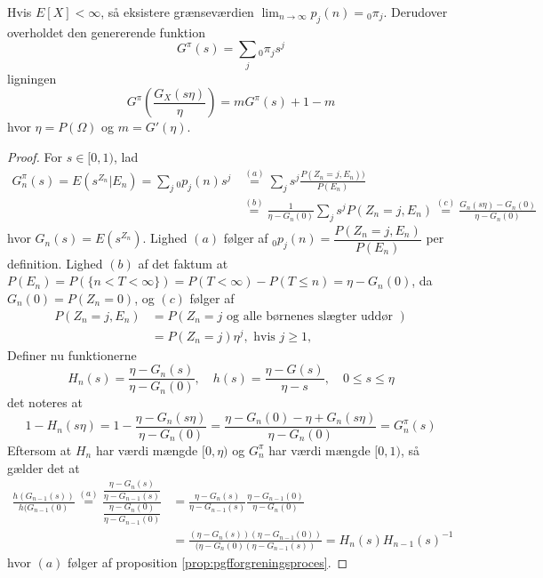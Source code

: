 \begin{lem}
Hvis $E[X] < \infty$, så eksistere grænseværdien $\lim_{n \to \infty} p_j (n) = {}_0\pi_j$. Derudover overholdet den genererende funktion
\begin{equation*}
    G^\pi(s) = \sum_j {}_0 \pi_j s^j
\end{equation*}
ligningen 
\begin{equation} \label{alg:alg6.7.2grim}
    G^\pi\left(\frac{G_X(s\eta)}{\eta}\right) = m G^\pi(s) + 1 - m
\end{equation}
hvor $\eta = P(\Omega)$ og $m = G'(\eta)$.
\end{lem}
\begin{proof}
For $s \in [0, 1)$, lad
\begin{align*}
    G_n^\pi (s) = E(s^{Z_n} | E_n) = \sum_j {}_0p_j(n)s^j &\stackrel{(a)}= \sum_j s^j \frac{P(Z_n = j, E_n))}{P(E_n)} \\ 
    &\stackrel{(b)} = \frac{1}{\eta - G_n(0)} \sum_j s^j P(Z_n = j, E_n) \stackrel{(c)} = \frac{G_n(s\eta) - G_n(0)}{\eta - G_n(0)}
\end{align*}
hvor $G_n(s) = E(s^{Z_n})$. Lighed $(a)$ følger af ${}_0p_j(n) = \dfrac{P(Z_n = j, E_n)}{P(E_n)}$ per definition. Lighed $(b)$ af det faktum at $P(E_n) = P(\{n < T < \infty\}) = P(T < \infty) - P(T \leq n) = \eta - G_n(0)$, da $G_n(0) = P(Z_n = 0)$, og $(c)$ følger af
\begin{align*}
    P(Z_n = j, E_n) &= P(Z_n = j \text{ og alle børnenes slægter uddør }) \\
    &= P(Z_n = j) \eta^j, \text{ hvis } j \geq 1,
\end{align*}
Definer nu funktionerne 
\begin{equation*}
    H_n(s) = \frac{\eta - G_n(s)}{\eta - G_n(0)}, \quad h(s) = \frac{\eta - G(s)}{\eta - s}, \quad 0 \leq s \leq \eta
\end{equation*}
det noteres at 
\begin{equation*} \label{eq:lemmaErAids}
    1 - H_n(s \eta) = 1 - \frac{\eta - G_n(s\eta)}{\eta - G_n(0)} = \frac{\eta - G_n(0) - \eta + G_n(s\eta)}{\eta - G_n(0)} = G_n^\pi(s)
\end{equation*}
Eftersom at $H_n$ har værdi mængde $[0, \eta)$ og $G_n^\pi$ har værdi mængde $[0, 1)$, så gælder det at 
\begin{align*}
    \frac{h(G_{n - 1}(s))}{h(G_{n - 1}(0)} \stackrel{(a)}=
    \frac{\dfrac{\eta - G_{n}(s)}{\eta - G_{n - 1}(s)}}{\dfrac{\eta - G_{n}(0)}{\eta - G_{n - 1}(0)}} &= 
    \frac{\eta - G_{n}(s)}{\eta - G_{n - 1}(s)}\frac{\eta - G_{n-1}(0)}{\eta - G_{n}(0)} \\
    &= 
    \frac{(\eta - G_{n}(s))(\eta -  G_{n - 1}(0))}{(\eta - G_n(0)(\eta - G_{n - 1}(s))}
    =
    H_n(s)H_{n - 1}(s)^{-1}
\end{align*}
hvor $(a)$ følger af proposition \ref{prop:pgfforgreningsproces}. 


\end{proof}
